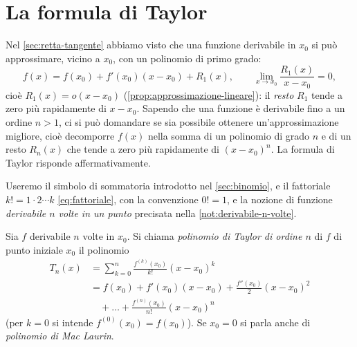 \section{La formula di Taylor}
\label{sec:taylor}

Nel \cref{sec:retta-tangente} abbiamo visto che una funzione derivabile in $x_{0}$ si
può approssimare, vicino a $x_{0}$, con un polinomio di primo grado:
\begin{equation}\label{eq:taylor-ordine-1}
  f(x)=f(x_{0})+f'(x_{0})(x-x_{0})+R_{1}(x), \qquad
  \lim_{x\to x_{0}}\frac{R_{1}(x)}{x-x_{0}}=0 ,
\end{equation}
cioè $R_{1}(x)=o(x-x_{0})$ (\cref{prop:approssimazione-lineare}): il \emph{resto} $R_{1}$
tende a zero più rapidamente di $x-x_{0}$. Sapendo che una funzione è derivabile fino
a un ordine $n>1$, ci si può domandare se sia possibile ottenere un'approssimazione
migliore, cioè decomporre $f(x)$ nella somma di un polinomio di grado $n$ e di un resto
$R_{n}(x)$ che tende a zero più rapidamente di $(x-x_{0})^{n}$. La formula di Taylor
risponde affermativamente.

Useremo il simbolo di sommatoria introdotto nel \cref{sec:binomio}, e il fattoriale
$k!=1\cdot2\cdots k$ \eqref{eq:fattoriale}, con la convenzione $0!=1$, e la nozione di
funzione \emph{derivabile $n$ volte in un punto} precisata nella
\cref{not:derivabile-n-volte}.

\begin{definizione}\label{def:polinomio-taylor}
Sia $f$ derivabile $n$ volte in $x_{0}$. Si chiama \emph{polinomio di Taylor di ordine
$n$} di $f$ di punto iniziale $x_{0}$ il polinomio
\begin{equation}\label{eq:polinomio-taylor}
\begin{split}
  T_{n}(x)&=\sum_{k=0}^{n}\frac{f^{(k)}(x_{0})}{k!}(x-x_{0})^{k}\\
  &=f(x_{0})+f'(x_{0})(x-x_{0})+\frac{f''(x_{0})}{2}(x-x_{0})^{2}\\
  &\quad+\dots+\frac{f^{(n)}(x_{0})}{n!}(x-x_{0})^{n}
\end{split}
\end{equation}
(per $k=0$ si intende $f^{(0)}(x_{0})=f(x_{0})$). Se $x_{0}=0$ si parla anche di
\emph{polinomio di Mac Laurin}.
\end{definizione}

